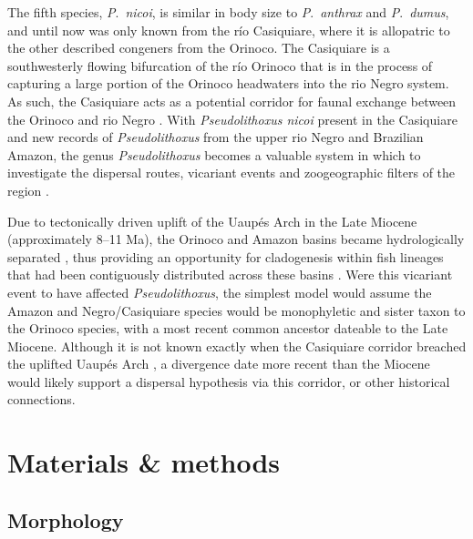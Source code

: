 \documentclass[12pt]{article}
\begin{document}
The fifth species, \emph{P}.\ \emph{nicoi}, is similar in body size to \emph{P}.\ \emph{anthrax} and \emph{P}.\ \emph{dumus}, and until now was only known from the río Casiquiare, where it is allopatric to the other described congeners from the Orinoco. %
 The Casiquiare is a southwesterly flowing bifurcation of the río Orinoco that is in the process of capturing a large portion of the Orinoco headwaters into the rio Negro system. %
 As such, the Casiquiare acts as a potential corridor for faunal exchange between the Orinoco and rio Negro \citep{Lujan2011kelsorum,Winemiller2008,Winemiller2011}. %
 With \emph{Pseudolithoxus nicoi} present in the Casiquiare and new records of \emph{Pseudolithoxus} from the upper rio Negro and Brazilian Amazon, the genus \emph{Pseudolithoxus} becomes a valuable system in which to investigate the dispersal routes, vicariant events and zoogeographic filters of the region \citep{Winemiller2008}.%
 
Due to tectonically driven uplift of the Uaupés Arch in the Late Miocene (approximately 8–11 Ma), the Orinoco and Amazon basins became hydrologically separated \citep{Albert2011,Lundberg1998,Wesselingh2011}, thus providing an opportunity for cladogenesis within fish lineages that had been contiguously distributed across these basins \citep{Lovejoy2010}. %
 Were this vicariant event to have affected \emph{Pseudolithoxus}, the simplest model would assume the Amazon and Negro/Casiquiare species would be monophyletic and sister taxon to the Orinoco species, with a most recent common ancestor dateable to the Late Miocene. %
 Although it is not known exactly when the Casiquiare corridor breached the uplifted Uaupés Arch \citep{Willis2010,Winemiller2011}, a divergence date more recent than the Miocene would likely support a dispersal hypothesis via this corridor, or other historical connections.%


\section*{Materials \& methods}

\subsection*{Morphology}
\end{document}
